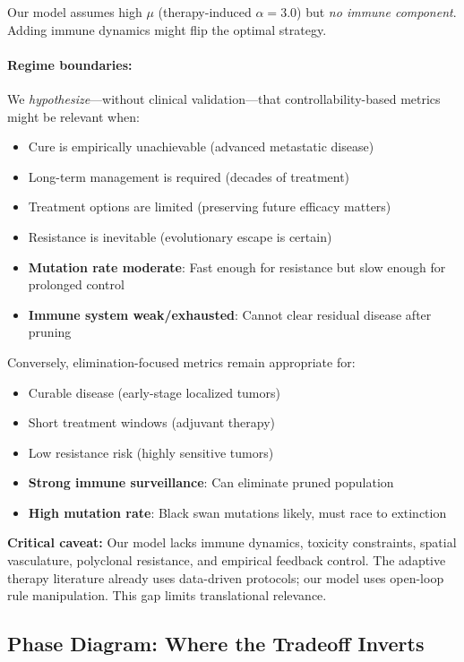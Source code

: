 \documentclass[11pt,a4paper]{article}
\begin{document}
Our model assumes high $\mu$ (therapy-induced $\alpha = 3.0$) but \textit{no immune component}. Adding immune dynamics might flip the optimal strategy.

\paragraph{Regime boundaries:} We \textit{hypothesize}---without clinical validation---that controllability-based metrics might be relevant when:

\begin{itemize}
    \item Cure is empirically unachievable (advanced metastatic disease)
    \item Long-term management is required (decades of treatment)
    \item Treatment options are limited (preserving future efficacy matters)
    \item Resistance is inevitable (evolutionary escape is certain)
    \item \textbf{Mutation rate moderate}: Fast enough for resistance but slow enough for prolonged control
    \item \textbf{Immune system weak/exhausted}: Cannot clear residual disease after pruning
\end{itemize}

Conversely, elimination-focused metrics remain appropriate for:

\begin{itemize}
    \item Curable disease (early-stage localized tumors)
    \item Short treatment windows (adjuvant therapy)
    \item Low resistance risk (highly sensitive tumors)
    \item \textbf{Strong immune surveillance}: Can eliminate pruned population
    \item \textbf{High mutation rate}: Black swan mutations likely, must race to extinction
\end{itemize}

\textbf{Critical caveat:} Our model lacks immune dynamics, toxicity constraints, spatial vasculature, polyclonal resistance, and empirical feedback control. The adaptive therapy literature already uses data-driven protocols; our model uses open-loop rule manipulation. This gap limits translational relevance.

\subsection{Phase Diagram: Where the Tradeoff Inverts}
\end{document}
